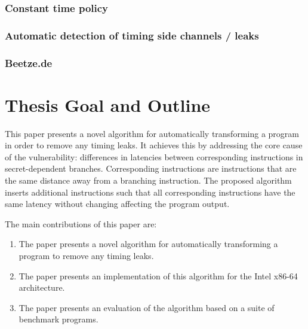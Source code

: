\subsubsection{Constant time policy}


\subsubsection{Automatic detection of timing side channels / leaks}


\subsubsection{Beetze.de}
	
\section{Thesis Goal and Outline}
This paper presents a novel algorithm for automatically transforming a program in order to remove any timing leaks. It achieves this by addressing the core cause of the vulnerability: differences in 
latencies between corresponding instructions in secret-dependent branches. Corresponding instructions are instructions that are the same distance away from a branching instruction. 
The proposed algorithm inserts additional instructions such that all corresponding instructions have the same latency without changing affecting the program output. 

The main contributions of this paper are:
\begin{enumerate}
\item The paper presents a novel algorithm for automatically transforming a program to remove any timing leaks.
\item The paper presents an implementation of this algorithm for the Intel x86-64 architecture. 
\item The paper presents an evaluation of the algorithm based on a suite of benchmark programs. 
\end{enumerate}


